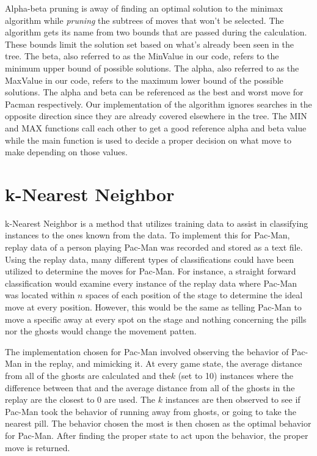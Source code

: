 \documentclass[a4paper,oneside,10pt]{report}
\begin{document}
Alpha-beta pruning is away of finding an optimal solution to the minimax algorithm while \textit{pruning} the subtrees of moves that won't be selected. The algorithm gets its name from two bounds that are passed during the calculation. These bounds limit the solution set based on what's already been seen in the tree. The beta, also referred to as the MinValue in our code, refers to the minimum upper bound of possible solutions. The alpha, also referred to as the MaxValue in our code, refers to the maximum lower bound of the possible solutions. The alpha and beta can be referenced as the best and worst move for Pacman respectively. Our implementation of the algorithm ignores searches in the opposite direction since they are already covered elsewhere in the tree. The MIN and MAX functions call each other to get a good reference alpha and beta value while the main function is used to decide a proper decision on what move to make depending on those values.

\section{k-Nearest Neighbor}\label{knn}

k-Nearest Neighbor is a method that utilizes training data to assist in classifying instances to the ones known from the data. To implement this for Pac-Man, replay data of a person playing Pac-Man was recorded and stored as a text file. Using the replay data, many different types of classifications could have been utilized to determine the moves for Pac-Man. For instance, a straight forward classification would examine every instance of the replay data where Pac-Man was located within $n$ spaces of each position of the stage to determine the ideal move at every position. However, this would be the same as telling Pac-Man to move a specific away at every spot on the stage and nothing concerning the pills nor the ghosts would change the movement patten. 

The implementation chosen for Pac-Man involved observing the behavior of Pac-Man in the replay, and mimicking it. At every game state, the average distance from all of the ghosts are calculated and the$k$ (set to 10) instances where the difference between that and the average distance from all of the ghosts in the replay are the closest to 0 are used. The $k$ instances are then observed to see if Pac-Man took the behavior of running away from ghosts, or going to take the nearest pill. The behavior chosen the most is then chosen as the optimal behavior for Pac-Man. After finding the proper state to act upon the behavior, the proper move is returned.
\end{document}
